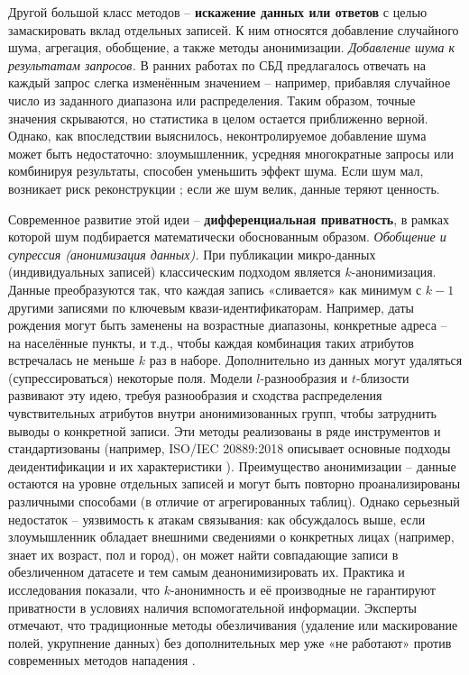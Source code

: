 Другой большой класс методов – \textbf{искажение данных или ответов} с целью замаскировать вклад отдельных записей. К
ним относятся добавление случайного шума, агрегация, обобщение, а также методы анонимизации. \textit{Добавление шума к
результатам запросов.} В ранних работах по СБД предлагалось отвечать на каждый запрос слегка изменённым значением –
например, прибавляя случайное число из заданного диапазона или распределения. Таким образом, точные значения скрываются,
но статистика в целом остается приближенно верной. Однако, как впоследствии выяснилось, неконтролируемое добавление шума
может быть недостаточно: злоумышленник, усредняя многократные запросы или комбинируя результаты, способен уменьшить
эффект шума. Если шум мал, возникает риск реконструкции \autocite{differentialprivacy-org} ; если же шум велик, данные
теряют ценность.

Современное развитие этой идеи – \textbf{дифференциальная приватность}, в рамках которой шум
подбирается математически обоснованным образом. \textit{Обобщение и супрессия (анонимизация
данных).} При публикации микро-данных (индивидуальных записей) классическим подходом является $k$-анонимизация. Данные
преобразуются так, что каждая запись «сливается» как минимум с $k-1$ другими записями по ключевым квази-идентификаторам.
Например, даты рождения могут быть заменены на возрастные диапазоны, конкретные адреса – на населённые пункты, и т.д.,
чтобы каждая комбинация таких атрибутов встречалась не меньше $k$ раз в наборе. Дополнительно из данных могут удаляться
(супрессироваться) некоторые поля. Модели $l$-разнообразия и $t$-близости развивают эту идею, требуя разнообразия и
сходства распределения чувствительных атрибутов внутри анонимизованных групп, чтобы затруднить выводы о конкретной
записи. Эти методы реализованы в ряде инструментов и стандартизованы (например, ISO/IEC 20889:2018 описывает основные
подходы деидентификации и их характеристики \autocite{ISO-IEC-20889-2018} ). Преимущество анонимизации – данные остаются
на уровне отдельных записей и могут быть повторно проанализированы различными способами (в отличие от агрегированных
таблиц). Однако серьезный недостаток – уязвимость к атакам связывания: как обсуждалось выше, если злоумышленник обладает
внешними сведениями о конкретных лицах (например, знает их возраст, пол и город), он может найти совпадающие записи в
обезличенном датасете и тем самым деанонимизировать их. Практика и исследования показали, что $k$-анонимность и её
производные не гарантируют приватности в условиях наличия вспомогательной информации. Эксперты отмечают, что
традиционные методы обезличивания (удаление или маскирование полей, укрупнение данных) без дополнительных мер уже «не
работают» против современных методов нападения \autocite{cornell-edu}.

